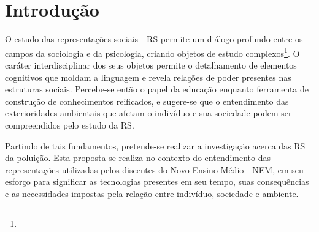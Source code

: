\documentclass[
  12pt,       %
  openright,      %
  twoside,      %
  a4paper,      %
  english,      %
  french,       %
  spanish,      %
  brazil        %
  ]{abntex2}
\begin{document}

\tableofcontents*
\cleardoublepage



\textual

\chapter{Introdução}

O estudo das representações sociais - RS permite um diálogo profundo entre os campos da sociologia e da psicologia, criando objetos de estudo complexos\footnote{}. O caráter interdisciplinar dos seus objetos permite o detalhamento de elementos cognitivos que moldam a linguagem e revela relações de poder presentes nas estruturas sociais. Percebe-se então o papel da educação enquanto ferramenta de construção de conhecimentos reificados, e sugere-se que o entendimento das exterioridades ambientais que afetam o indivíduo e sua sociedade podem ser compreendidos pelo estudo da RS.

Partindo de tais fundamentos, pretende-se realizar a investigação acerca das RS da poluição. Esta proposta se realiza no contexto do entendimento das representações utilizadas pelos discentes do Novo Ensino Médio - NEM, em seu esforço para significar as tecnologias presentes em seu tempo, suas consequências e as necessidades impostas pela relação entre indivíduo, sociedade e ambiente. 
\end{document}
